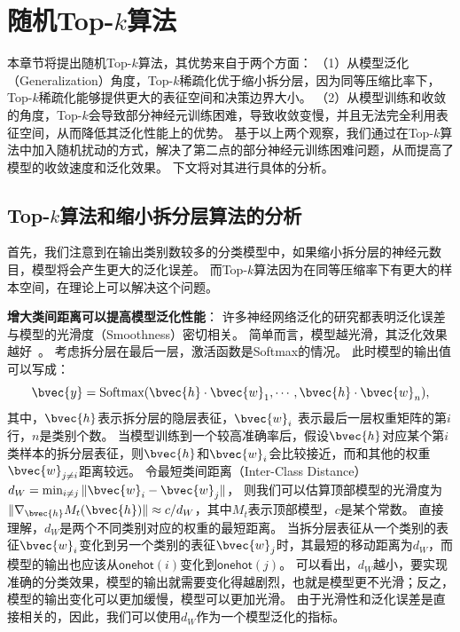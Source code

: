 \section{随机Top-$k$算法}
\label{sec:randomized_topk:method}
本章节将提出随机Top-$k$算法，其优势来自于两个方面：
（1）从模型泛化（Generalization）角度，Top-$k$稀疏化优于缩小拆分层，因为同等压缩比率下，Top-$k$稀疏化能够提供更大的表征空间和决策边界大小。
（2）从模型训练和收敛的角度，Top-$k$会导致部分神经元训练困难，导致收敛变慢，并且无法完全利用表征空间，从而降低其泛化性能上的优势。
%
基于以上两个观察，我们通过在Top-$k$算法中加入随机扰动的方式，解决了第二点的部分神经元训练困难问题，从而提高了模型的收敛速度和泛化效果。
%
下文将对其进行具体的分析。

\subsection{Top-$k$算法和缩小拆分层算法的分析}
首先，我们注意到在输出类别数较多的分类模型中，如果缩小拆分层的神经元数目，模型将会产生更大的泛化误差。
而Top-$k$算法因为在同等压缩率下有更大的样本空间，在理论上可以解决这个问题。


\textbf{增大类间距离可以提高模型泛化性能}：
许多神经网络泛化的研究都表明泛化误差与模型的光滑度（Smoothness）密切相关。
%
简单而言，模型越光滑，其泛化效果越好~\cite{neysharbur2015norm_capacity,neysharbur2017generalization,gouk2021lipschitz_reg}。
%
考虑拆分层在最后一层，激活函数是Softmax的情况。
此时模型的输出值可以写成：
\begin{equation}
    \bvec{y} = \text{Softmax}(\bvec{h}\cdot \bvec{w}_1, \cdots, \bvec{h} \cdot \bvec{w}_n),
\end{equation}
其中，$\bvec{h}$表示拆分层的隐层表征，$\bvec{w}_i$ 表示最后一层权重矩阵的第$i$行，$n$是类别个数。
%
当模型训练到一个较高准确率后，假设$\bvec{h}$对应某个第$i$类样本的拆分层表征，则$\bvec{h}$和$\bvec{w}_i$会比较接近，而和其他的权重$\bvec{w}_{j\ne i}$距离较远。
%
令最短类间距离（Inter-Class Distance）$d_W = \min_{i\ne j} \Vert \bvec{w}_i - \bvec{w}_j \Vert$，
则我们可以估算顶部模型的光滑度为$\Vert \nabla_{\bvec{h}} M_t(\bvec{h}) \Vert \approx c/d_W$，其中$M_t$表示顶部模型，$c$是某个常数。
%
直接理解，$d_W$是两个不同类别对应的权重的最短距离。
当拆分层表征从一个类别的表征$\bvec{w}_i$变化到另一个类别的表征$\bvec{w}_j$时，其最短的移动距离为$d_W$，而模型的输出也应该从$\mathsf{onehot}(i)$变化到$\mathsf{onehot}(j)$。
%
可以看出，$d_W$越小，要实现准确的分类效果，模型的输出就需要变化得越剧烈，也就是模型更不光滑；反之，模型的输出变化可以更加缓慢，模型可以更加光滑。
%
由于光滑性和泛化误差是直接相关的，因此，我们可以使用$d_W$作为一个模型泛化的指标。
%


